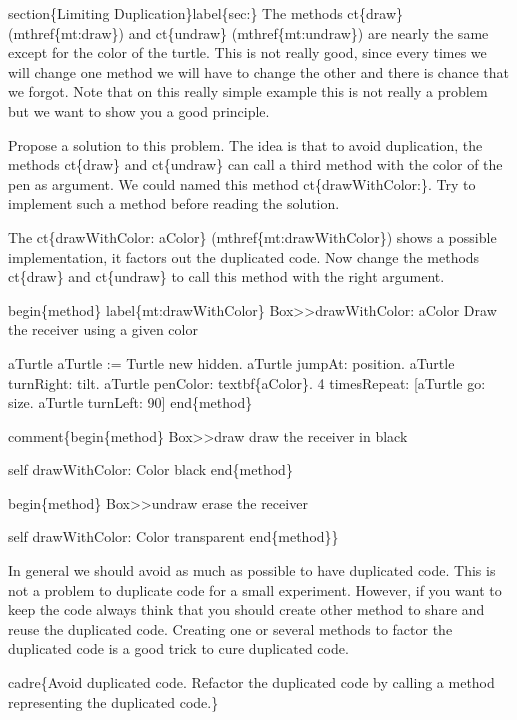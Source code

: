 \documentclass[10pt,twoside,english]{_support/latex/sbabook/sbabook}
\begin{document}
section\{Limiting Duplication\}label\{sec:\}
The methods ct\{draw\} (mthref\{mt:draw\}) and ct\{undraw\}
(mthref\{mt:undraw\}) are nearly the same except for the color of the
turtle.  This is not really good, since every times we will change one
method we will have to change the other and there is chance that we
forgot. Note that on this really simple example this is not really a
problem but we want to show you a good principle.

Propose a solution to this problem. The idea is that to avoid
duplication, the methods ct\{draw\} and ct\{undraw\} can call a third
method with the color of the pen as argument. We could named this
method ct\{drawWithColor:\}. Try to implement such a method before
reading the solution.

The ct\{drawWithColor: aColor\} (mthref\{mt:drawWithColor\}) shows a
possible implementation, it factors out the duplicated code. Now
change the methods ct\{draw\} and ct\{undraw\} to call this method with
the right argument.

begin\{method\} label\{mt:drawWithColor\}
Box\textgreater{}\textgreater{}drawWithColor: aColor 
   Draw the receiver using a given color
	
   \textbar{} aTurtle \textbar{}
   aTurtle := Turtle new hidden.
   aTurtle jumpAt: position.
   aTurtle turnRight: tilt.
   aTurtle penColor: textbf\{aColor\}.
   4 timesRepeat: {[}aTurtle go: size.
                  aTurtle turnLeft: 90{]}
end\{method\}

comment\{begin\{method\}
Box\textgreater{}\textgreater{}draw
   draw the receiver in black
   
   self drawWithColor: Color black
end\{method\}

begin\{method\}
Box\textgreater{}\textgreater{}undraw
   erase the receiver
   
    self drawWithColor: Color transparent
end\{method\}\}

In general we should avoid as much as possible to have duplicated
code.  This is not a problem to duplicate code for a small experiment.
However, if you want to keep the code always think that you should
create other method to share and reuse the duplicated code. Creating
one or several methods to factor the duplicated code is a good trick
to cure duplicated code.

cadre\{Avoid duplicated code. Refactor the duplicated code by calling 
a method representing the duplicated code.\}
\end{document}
